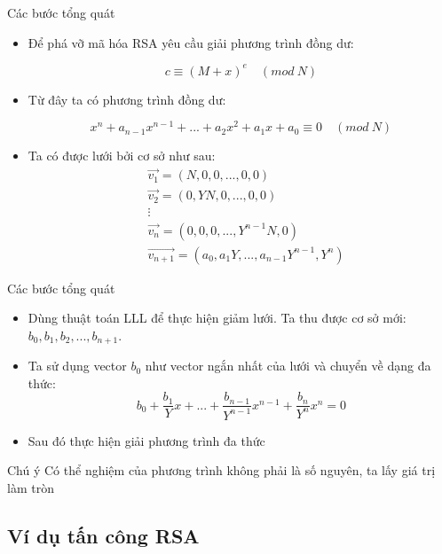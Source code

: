 \begin{frame}{Các bước tổng quát}

\begin{itemize}
\item Để phá vỡ mã hóa RSA yêu cầu giải phương trình đồng dư:

$$c \equiv (M + x)^e \quad (mod \ N)$$
\item Từ đây ta có phương trình đồng dư:

$$x^n + a_{n-1}x^{n-1} + ... + a_2x^2 + a_1x + a_0 \equiv 0 \quad (mod \ N) $$

\item Ta có được lưới bởi cơ sở như sau:
$$
\begin{aligned}
&\Vec{v_1} = (N, 0, 0, ..., 0, 0)\\
&\Vec{v_2} = (0, YN, 0, ..., 0, 0)\\
&\vdots\\
&\Vec{v_n} = (0, 0, 0, ..., Y^{n-1}N, 0)\\
&\Vec{v_{n+1}} = (a_0, a_1Y, ..., a_{n-1}Y^{n-1}, Y^{n})
\end{aligned}
$$

\end{itemize}
\end{frame}
\begin{frame}{Các bước tổng quát}

\begin{itemize}
\item Dùng thuật toán LLL để thực hiện giảm lưới. Ta thu được cơ sở mới: $b_0, b_1, b_2, ..., b_{n+1}$.
\item Ta sử dụng vector $b_0$ như vector ngắn nhất của lưới và chuyển về dạng đa thức:
$$b_0 + \frac{b_1}{Y}x + ... + \frac{b_{n-1}}{Y^{n-1}}x^{n-1} + \frac{b_n}{Y^n}x^n = 0$$
\item Sau đó thực hiện giải phương trình đa thức
\end{itemize}

\begin{block}{Chú ý}
Có thể nghiệm của phương trình không phải là số nguyên, ta lấy giá trị làm tròn
\end{block}

\end{frame}
\subsection{Ví dụ tấn công RSA}

